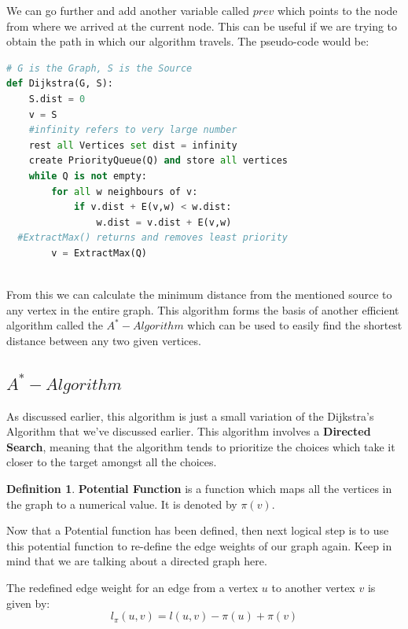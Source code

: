 \documentclass{article}
\theoremstyle{definition}
\newtheorem*{definition}{Definition}
\theoremstyle{example}
\begin{document}
We can go further and add another variable called $prev$ which points to the node from where we arrived at the current node. This can be useful if we are trying to obtain the path in which our algorithm travels. The pseudo-code would be:
\vspace{3mm}
\begin{lstlisting}[language=python, basicstyle = \Large]
# G is the Graph, S is the Source
def Dijkstra(G, S):
    S.dist = 0
    v = S
    #infinity refers to very large number
    rest all Vertices set dist = infinity
    create PriorityQueue(Q) and store all vertices
    while Q is not empty:
        for all w neighbours of v:
            if v.dist + E(v,w) < w.dist:
                w.dist = v.dist + E(v,w)
  #ExtractMax() returns and removes least priority
        v = ExtractMax(Q)
        
\end{lstlisting}
\vspace{4mm}
From this we can calculate the minimum distance from the mentioned source to any vertex in the entire graph. This algorithm forms the basis of another efficient algorithm called the $A^{*}-Algorithm$ which can be used to easily find the shortest distance between any two given vertices.

\subsection{\Large $A^*-Algorithm$}
\hspace{4mm} As discussed earlier, this algorithm is just a small variation of the Dijkstra's Algorithm that we've discussed earlier. This algorithm involves a \textbf{Directed Search}, meaning that the algorithm tends to prioritize the choices which take it closer to the target amongst all the choices.\par
\vspace{4mm}
\theoremstyle{definition}
\begin{definition}
    \textbf{Potential Function} is a function which maps all the vertices in the graph to a numerical value. It is denoted by $\pi(v)$.
\end{definition}

Now that a Potential function has been defined, then next logical step is to use this potential function to re-define the edge weights of our graph again. Keep in mind that we are talking about a directed graph here.\par
\vspace{4mm}
The redefined edge weight for an edge from a vertex $u$ to another vertex $v$ is given by:
\[l_{\pi}(u,v) = l(u,v) - \pi(u) + \pi(v)\]
\end{document}
